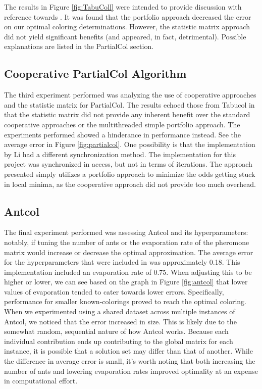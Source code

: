 \documentclass[runningheads]{llncs}
\begin{document}
The results in Figure \ref{fig:TabuColl} were intended to provide discussion with reference towards \cite{https://doi.org/10.5445/ir/1000083192}. It was found that the portfolio approach decreased the error on our optimal coloring determinations. However, the statistic matrix approach did not yield significant benefits (and appeared, in fact, detrimental). Possible explanations are listed in the PartialCol section.

\subsection{Cooperative PartialCol Algorithm}

The third experiment performed was analyzing the use of cooperative approaches and the statistic matrix for PartialCol. The results echoed those from Tabucol in that the statistic matrix did not provide any inherent benefit over the standard cooperative approaches or the multithreaded simple portfolio approach. The experiments performed showed a hinderance in performance instead. See the average error in Figure \ref{fig:partialcol}.
One possibility is that the implementation by Li had a different synchronization method. The implementation for this project was synchronized in access, but not in terms of iterations. The approach presented simply utilizes a portfolio approach to minimize the odds getting stuck in local minima, as the cooperative approach did not provide too much overhead.

\subsection{Antcol}

The final experiment performed was assessing Antcol and its hyperparameters: notably, if tuning the number of ants or the evaporation rate of the pheromone matrix would increase or decrease the optimal approximation. The average error for the hyperparameters that were included in \cite{10.5555/2851123} was approximately 0.18. This implementation included an evaporation rate of 0.75. When adjusting this to be higher or lower, we can see based on the graph in Figure \ref{fig:antcol} that lower values of evaporation tended to cater towards lower errors. Specifically, performance for smaller known-colorings proved to reach the optimal coloring. When we experimented using a shared dataset across multiple instances of Antcol, we noticed that the error increased in size. This is likely due to the somewhat random, sequential nature of how Antcol works. Because each individual contribution ends up contributing to the global matrix for each instance, it is possible that a solution set may differ than that of another. While the difference in average error is small, it's worth noting that both increasing the number of ants and lowering evaporation rates improved optimality at an expense in computational effort.
\end{document}
